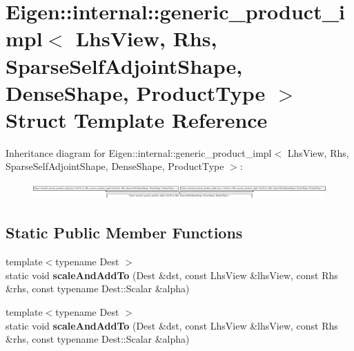 \hypertarget{struct_eigen_1_1internal_1_1generic__product__impl_3_01_lhs_view_00_01_rhs_00_01_sparse_self_adj0d7cb22d06770c150f0f74fa6f4e5968}{}\section{Eigen\+:\+:internal\+:\+:generic\+\_\+product\+\_\+impl$<$ Lhs\+View, Rhs, Sparse\+Self\+Adjoint\+Shape, Dense\+Shape, Product\+Type $>$ Struct Template Reference}
\label{struct_eigen_1_1internal_1_1generic__product__impl_3_01_lhs_view_00_01_rhs_00_01_sparse_self_adj0d7cb22d06770c150f0f74fa6f4e5968}
Inheritance diagram for Eigen\+:\+:internal\+:\+:generic\+\_\+product\+\_\+impl$<$ Lhs\+View, Rhs, Sparse\+Self\+Adjoint\+Shape, Dense\+Shape, Product\+Type $>$\+:\begin{figure}[H]
\begin{center}
\leavevmode
\includegraphics[height=0.618785cm]{struct_eigen_1_1internal_1_1generic__product__impl_3_01_lhs_view_00_01_rhs_00_01_sparse_self_adj0d7cb22d06770c150f0f74fa6f4e5968}
\end{center}
\end{figure}
\subsection*{Static Public Member Functions}
\begin{DoxyCompactItemize}
\item 
\mbox{\label{struct_eigen_1_1internal_1_1generic__product__impl_3_01_lhs_view_00_01_rhs_00_01_sparse_self_adj0d7cb22d06770c150f0f74fa6f4e5968_afbe2cd4acb9e70b8b669534e9748b51b}} 
{\footnotesize template$<$typename Dest $>$ }\\static void {\bfseries scale\+And\+Add\+To} (Dest \&dst, const Lhs\+View \&lhs\+View, const Rhs \&rhs, const typename Dest\+::\+Scalar \&alpha)
\item 
\mbox{\label{struct_eigen_1_1internal_1_1generic__product__impl_3_01_lhs_view_00_01_rhs_00_01_sparse_self_adj0d7cb22d06770c150f0f74fa6f4e5968_afbe2cd4acb9e70b8b669534e9748b51b}} 
{\footnotesize template$<$typename Dest $>$ }\\static void {\bfseries scale\+And\+Add\+To} (Dest \&dst, const Lhs\+View \&lhs\+View, const Rhs \&rhs, const typename Dest\+::\+Scalar \&alpha)
\end{DoxyCompactItemize}
